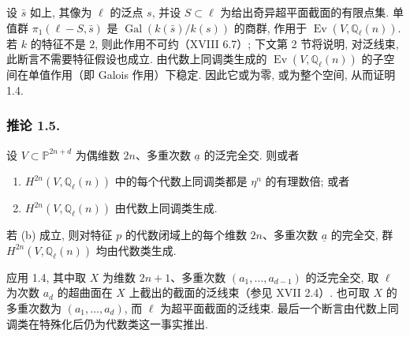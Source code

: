 设 $\bar s$ 如上, 其像为 $\ell$ 的泛点 $s$, 并设 $S\subset\ell$ 为给出奇异超平面截面的有限点集. 单值群 $\pi_1(\ell-S,\bar s)$ 是 $\operatorname{Gal}(k(\bar s)/k(s))$ 的商群, 作用于 $\operatorname{Ev}(V,\mathbb Q_\ell(n))$. 若 $k$ 的特征不是 $2$, 则此作用不可约（XVIII 6.7）; 下文第 2 节将说明, 对泛线束, 此断言不需要特征假设也成立. 由代数上同调类生成的 $\operatorname{Ev}(V,\mathbb Q_\ell(n))$ 的子空间在单值作用（即 Galois 作用）下稳定. 因此它或为零, 或为整个空间, 从而证明 1.4.

\subsubsection*{推论 1.5.}
设 $V\subset\mathbb P^{2n+d}$ 为偶维数 $2n$、多重次数 $\underline a$ 的泛完全交. 则或者
\begin{enumerate}[label=(\alph*)]
\item $H^{2n}(V,\mathbb Q_\ell(n))$ 中的每个代数上同调类都是 $\eta^n$ 的有理数倍; 或者
\item $H^{2n}(V,\mathbb Q_\ell(n))$ 由代数上同调类生成.
\end{enumerate}
若 (b) 成立, 则对特征 $p$ 的代数闭域上的每个维数 $2n$、多重次数 $\underline a$ 的完全交, 群 $H^{2n}(V,\mathbb Q_\ell(n))$ 均由代数类生成.

应用 1.4, 其中取 $X$ 为维数 $2n+1$、多重次数 $(a_1,\ldots,a_{d-1})$ 的泛完全交, 取 $\ell$ 为次数 $a_d$ 的超曲面在 $X$ 上截出的截面的泛线束（参见 XVII 2.4）. 也可取 $X$ 的多重次数为 $(a_1,\ldots,a_d)$, 而 $\ell$ 为超平面截面的泛线束. 最后一个断言由代数上同调类在特殊化后仍为代数类这一事实推出.
